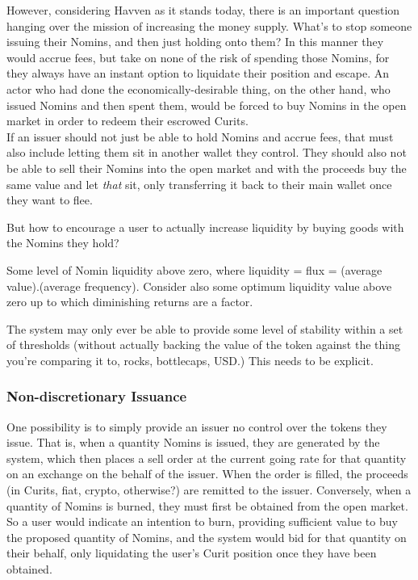 \noindent However, considering Havven as it stands today, there is an important question hanging over the mission of increasing the money supply. What's to stop someone issuing their Nomins, and then just holding onto them? In this manner they would accrue fees, but take on none of the risk of spending those Nomins, for they always have an instant option to liquidate their position and escape. An actor who had done the economically-desirable thing, on the other hand, who issued Nomins and then spent them, would be forced to buy Nomins in the open market in order to redeem their escrowed Curits. \\

\noindent If an issuer should not just be able to hold Nomins and accrue fees, that must also include letting them sit in another wallet they control. They should also not be able to sell their Nomins into the open market and with the proceeds buy the same value and let \textit{that} sit, only transferring it back to their main wallet once they want to flee.

\noindent But how to encourage a user to actually increase liquidity by buying goods with the Nomins they hold? 

\noindent Some level of Nomin liquidity above zero, where liquidity = flux = (average value).(average frequency). Consider also some optimum liquidity value above zero up to which diminishing returns are a factor.

The system may only ever be able to provide some level of stability within a set of thresholds (without actually backing the value of the token against the thing you're comparing it to, rocks, bottlecaps, USD.) This needs to be explicit.


\subsubsection{Non-discretionary Issuance}

One possibility is to simply provide an issuer no control over the tokens they issue. That is, when a quantity Nomins is issued, they are generated by the system, which then places a sell order at the current going rate for that quantity on an exchange on the behalf of the issuer. When the order is filled, the proceeds (in Curits, fiat, crypto, otherwise?) are remitted to the issuer.
Conversely, when a quantity of Nomins is burned, they must first be obtained from the open market. So a user would indicate an intention to burn, providing sufficient value to buy the proposed quantity of Nomins, and the system would bid for that quantity on their behalf, only liquidating the user's Curit position once they have been obtained.

